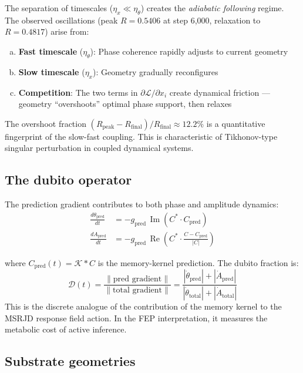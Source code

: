 \documentclass[12pt,a4paper]{article}
\theoremstyle{plain}
\theoremstyle{definition}
\begin{document}
The separation of timescales ($\eta_x \ll \eta_\theta$) creates the
\emph{adiabatic following} regime. The observed oscillations (peak $R = 0.5406$
at step 6,000, relaxation to $R = 0.4817$) arise from:
\begin{enumerate}[(a)]
  \item \textbf{Fast timescale} ($\eta_\theta$): Phase coherence rapidly adjusts to current geometry
  \item \textbf{Slow timescale} ($\eta_x$): Geometry gradually reconfigures
  \item \textbf{Competition}: The two terms in $\partial\mathcal{L}/\partial x_i$ create dynamical friction --- geometry ``overshoots'' optimal phase support, then relaxes
\end{enumerate}
The overshoot fraction $(R_{\text{peak}} - R_{\text{final}})/R_{\text{final}} \approx 12.2\%$
is a quantitative fingerprint of the slow-fast coupling. This is characteristic
of Tikhonov-type singular perturbation in coupled dynamical systems.

\subsection{The dubito operator}

The prediction gradient contributes to both phase and amplitude dynamics:
\begin{align}
\frac{d\theta_{\text{pred}}}{dt} &= -g_{\text{pred}}\,
  \operatorname{Im}(C^* \cdot C_{\text{pred}}) \\
\frac{dA_{\text{pred}}}{dt} &= -g_{\text{pred}}\,
  \operatorname{Re}\!\left(C^* \cdot
  \frac{C - C_{\text{pred}}}{|C|}\right)
\end{align}

where $C_{\text{pred}}(t) = \mathcal{K} * C$ is the memory-kernel prediction.
The dubito fraction is:
\begin{equation}
\mathcal{D}(t) = \frac{\|\text{pred gradient}\|}{\|\text{total gradient}\|}
  = \frac{|\dot\theta_{\text{pred}}| + |\dot A_{\text{pred}}|}
         {|\dot\theta_{\text{total}}| + |\dot A_{\text{total}}|}
\end{equation}
This is the discrete analogue of the contribution of the memory kernel
to the MSRJD response field action. In the FEP interpretation, it
measures the metabolic cost of active inference.

\subsection{Substrate geometries}
\end{document}
